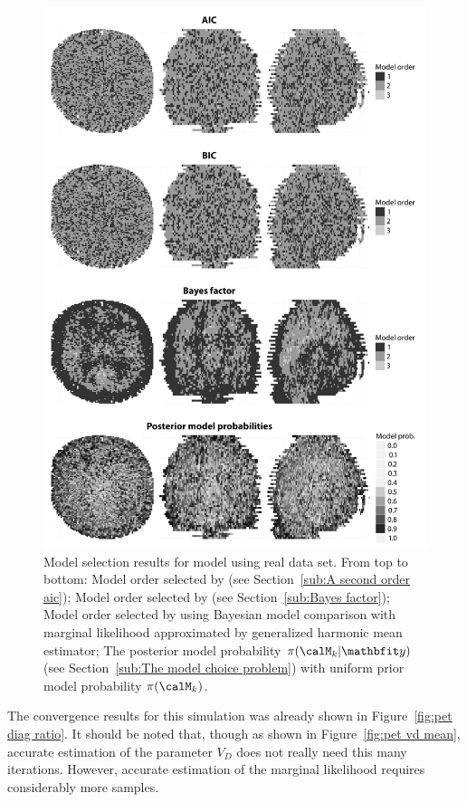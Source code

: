 \begin{figure}
  \includegraphics[width=\linewidth]{fig/PET_MO}
  \caption{Model selection results for \pet model using real data set. From
    top to bottom: Model order selected by \aicc (see Section~\ref{sub:A
      second order aic}); Model order selected by \bic (see
    Section~\ref{sub:Bayes factor}); Model order selected by using Bayesian
    model comparison with marginal likelihood approximated by generalized
    harmonic mean estimator; The posterior model probability
    $\pi(\calM_k|\data)$ (see Section~\ref{sub:The model choice problem}) with
    uniform prior model probability $\pi(\calM_k)$.}
  \label{fig:pet mo}
\end{figure}

The convergence results for this simulation was already shown in
Figure~\ref{fig:pet diag ratio}. It should be noted that, though as shown in
Figure~\ref{fig:pet vd mean}, accurate estimation of the parameter $V_D$ does
not really need this many iterations. However, accurate estimation of the
marginal likelihood requires considerably more samples.

